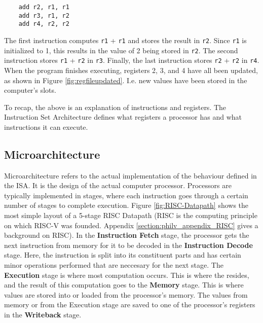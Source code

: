     \begin{verbatim}
    add r2, r1, r1
    add r3, r1, r2
    add r4, r2, r2
    \end{verbatim}
    The first instruction computes \texttt{r1} + \texttt{r1} and stores the result in \texttt{r2}. Since \texttt{r1} is initialized to 1, this results in the value of 2 being stored in \texttt{r2}. The second instruction stores \texttt{r1} + \texttt{r2} in \texttt{r3}. Finally, the last instruction stores \texttt{r2} + \texttt{r2} in \texttt{r4}. When the program finishes executing, registers 2, 3, and 4 have all been updated, as shown in Figure \ref{fig:regfileupdated}. I.e. new values have been stored in the computer's slots.

    

    To recap, the above is an explanation of instructions and registers. The Instruction Set Architecture defines what registers a processor has and what instructions it can execute.

\subsection{Microarchitecture}

    

    Microarchitecture refers to the actual implementation of the behaviour defined in the \gls{ISA}. It is the design of the actual computer processor. Processors are typically implemented in stages, where each instruction goes through a certain number of stages to complete execution.
    Figure \ref{fig:RISC-Datapath} shows the most simple layout of a 5-stage \gls{RISC} Datapath (\gls{RISC} is the computing principle on which RISC-V was founded. Appendix \ref{section:philv_appendix_RISC} gives a background on RISC). In the \textbf{Instruction Fetch} stage, the processor gets the next instruction from memory for it to be decoded in the \textbf{Instruction Decode} stage. Here, the instruction is split into its constituent parts and has certain minor operations performed that are neccesary for the next stage. The \textbf{Execution} stage is where most computation occurs. This is where the  resides, and the result of this computation goes to the \textbf{Memory} stage. This is where values are stored into or loaded from the processor's memory. The values from memory or from the Execution stage are saved to one of the processor's registers in the \textbf{Writeback} stage. 
